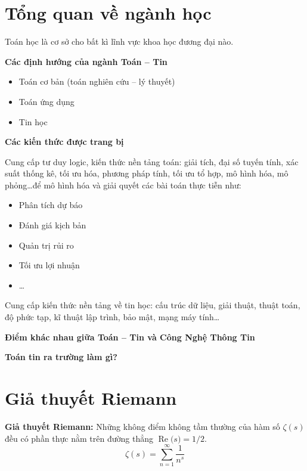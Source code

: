 \documentclass[14pt]{extarticle}
\newcommand{\real}[1]{\operatorname{Re}{#1}}
\begin{document}
\section{Tổng quan về ngành học}
Toán học là cơ sở cho bất kì lĩnh vực khoa học đương đại nào.

\textbf{Các định hướng của ngành Toán -- Tin}
\begin{itemize}
	\item Toán cơ bản (toán nghiên cứu -- lý thuyết)
	\item Toán ứng dụng
	\item Tin học
\end{itemize}

\textbf{Các kiến thức được trang bị}\par
Cung cấp tư duy logic, kiến thức nền tảng toán: giải tích, đại số tuyến tính, xác suất thống kê, tối ưu hóa, phương pháp tính, tối ưu tổ hợp, mô hình hóa, mô phỏng\ldots để mô hình hóa và giải quyết các bài toán thực tiễn như:
\begin{itemize}
	\item Phân tích dự báo
	\item Đánh giá kịch bản
	\item Quản trị rủi ro
	\item Tối ưu lợi nhuận
	\item \ldots
\end{itemize}

Cung cấp kiến thức nền tảng về tin học: cấu trúc dữ liệu, giải thuật, thuật toán, độ phức tạp, kĩ thuật lập trình, bảo mật, mạng máy tính\ldots

\textbf{Điểm khác nhau giữa Toán -- Tin và Công Nghệ Thông Tin}\par

\textbf{Toán tin ra trường làm gì?}\par

\section{Giả thuyết Riemann}

\textbf{Giả thuyết Riemann: }Những không điểm không tầm thường của hàm số $\zeta(s)$ đều có phần thực nằm trên đường thẳng $\real(s) = 1/2$.
\begin{equation*}
	\zeta(s) = \sum_{n=1}^\infty \frac 1 {n^s}
\end{equation*}
\end{document}
